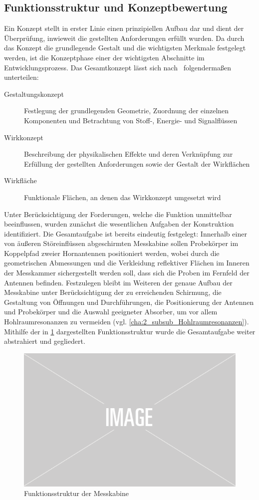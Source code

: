 


\subsection{Funktionsstruktur und Konzeptbewertung}

Ein Konzept stellt in erster Linie einen prinzipiellen Aufbau dar und dient der Überprüfung, inwieweit die gestellten Anforderungen erfüllt wurden. Da durch das Konzept die grundlegende Gestalt und die wichtigsten Merkmale festgelegt werden, ist die Konzeptphase einer der wichtigsten Abschnitte im Entwicklungsprozess. Das Gesamtkonzept lässt sich nach~\cite{Pahl_Beitz_Konstruktionslehre} folgendermaßen unterteilen:

\begin{description}
    \item[Gestaltungskonzept] Festlegung der grundlegenden Geometrie, Zuordnung der einzelnen Komponenten und Betrachtung von Stoff-, Energie- und Signalflüssen
    \item[Wirkkonzept] Beschreibung der physikalischen Effekte und deren Verknüpfung zur Erfüllung der gestellten Anforderungen sowie der Gestalt der Wirkflächen
    \item[Wirkfläche] Funktionale Flächen, an denen das Wirkkonzept umgesetzt wird
\end{description}

Unter Berücksichtigung der Forderungen, welche die Funktion unmittelbar beeinflussen, wurden zunächst die wesentlichen Aufgaben der Konstruktion identifiziert. Die Gesamtaufgabe ist bereits eindeutig festgelegt: Innerhalb einer von äußeren Störeinflüssen abgeschirmten Messkabine sollen Probekörper im Koppelpfad zweier Hornantennen positioniert werden, wobei durch die geometrischen Abmessungen und die Verkleidung reflektiver Flächen im Inneren der Messkammer sichergestellt werden soll, dass sich die Proben im Fernfeld der Antennen befinden. Festzulegen bleibt im Weiteren der genaue Aufbau der Messkabine unter Berücksichtigung der zu erreichenden Schirmung, die Gestaltung von Öffnungen und Durchführungen, die Positionierung der Antennen und Probekörper und die Auswahl geeigneter Absorber, um vor allem Hohlraumresonanzen zu vermeiden (vgl. \Abschnitt\ref{cha:2_subsub_Hohlraumresonanzen}). Mithilfe der in \Abb\ref{fig:3_Funktionsstruktur} dargestellten Funktionsstruktur wurde die Gesamtaufgabe weiter abstrahiert und gegliedert.

\begin{figure}[ht]
    \centering
    \includegraphics[width=.6\textwidth]{Abbildungen/placeholder.png}
    \caption{Funktionsstruktur der Messkabine}
    \label{fig:3_Funktionsstruktur}
\end{figure}


